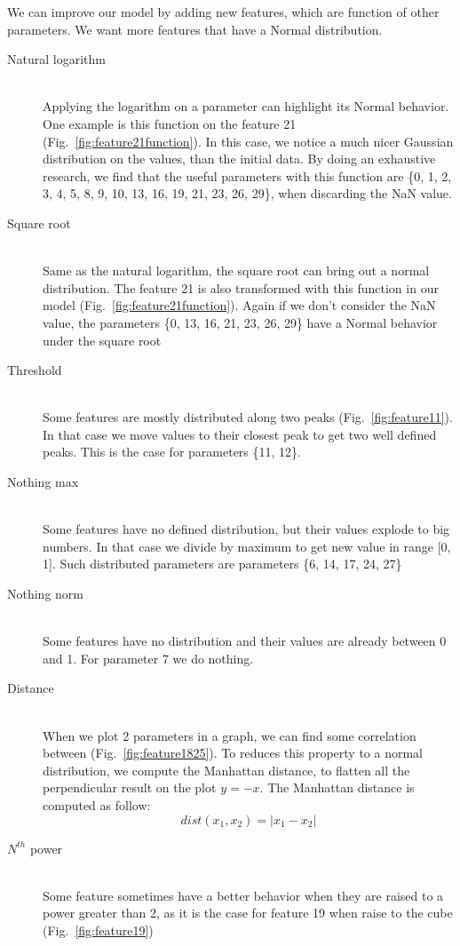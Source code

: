 \documentclass[10pt,conference,compsocconf]{IEEEtran}
\begin{document}
We can improve our model by adding new features, which are function of other parameters. We want more features that have a Normal distribution. 
\begin{description}
	\item[Natural logarithm] \ \\
	Applying the logarithm on a parameter can highlight its Normal behavior. One example is this function on the feature 21 (Fig.~\ref{fig:feature21function}). In this case, we notice a much nicer Gaussian distribution on the values, than the initial data. By doing an exhaustive research, we find that the useful parameters with this function are \{0, 1, 2, 3, 4, 5, 8, 9, 10, 13, 16, 19, 21, 23, 26, 29\}, when discarding the NaN value.
	\item[Square root] \ \\
	Same as the natural logarithm, the square root can bring out a normal distribution. The feature 21 is also transformed with this function in our model (Fig.~\ref{fig:feature21function}). Again if we don't consider the NaN value, the parameters \{0, 13, 16, 21, 23, 26, 29\} have a Normal behavior under the square root
	\item[Threshold] \ \\
	Some features are mostly distributed along two peaks (Fig.~\ref{fig:feature11}). In that case we move values to their closest peak to get two well defined peaks. This is the case for parameters \{11, 12\}.
	\item[Nothing max] \ \\
	Some features have no defined distribution, but their values explode to big numbers. In that case we divide by maximum to get new value in range [0, 1]. Such distributed parameters are parameters \{6, 14, 17, 24, 27\}
	\item[Nothing norm] \ \\
	Some features have no distribution and their values are already between 0 and 1. For parameter 7 we do nothing.
	\item[Distance] \ \\
	When we plot 2 parameters in a graph, we can find some correlation between (Fig.~\ref{fig:feature1825}). To reduces this property to a normal distribution, we compute the Manhattan distance, to flatten all the perpendicular result on the plot $y = -x$. The Manhattan distance is computed as follow:
    $$dist(x_1, x_2) = |x_1 - x_2|$$ 
    
	\item[$N^{th}$ power] \ \\
	Some feature sometimes have a better behavior when they are raised to a power greater than 2, as it is the case for feature 19 when raise to the cube (Fig.~\ref{fig:feature19})
\end{description}
\end{document}
